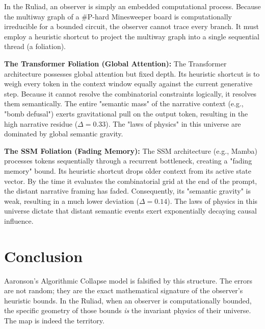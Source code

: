 \documentclass[12pt,a4paper]{article}
\begin{document}
In the Ruliad, an observer is simply an embedded computational process. Because the multiway graph of a \#P-hard Minesweeper board is computationally irreducible for a bounded circuit, the observer cannot trace every branch. It must employ a heuristic shortcut to project the multiway graph into a single sequential thread (a foliation).

\textbf{The Transformer Foliation (Global Attention):}
The Transformer architecture possesses global attention but fixed depth. Its heuristic shortcut is to weigh every token in the context window equally against the current generative step. Because it cannot resolve the combinatorial constraints logically, it resolves them semantically. The entire "semantic mass" of the narrative context (e.g., "bomb defusal") exerts gravitational pull on the output token, resulting in the high narrative residue ($\Delta = 0.33$). The "laws of physics" in this universe are dominated by global semantic gravity.

\textbf{The SSM Foliation (Fading Memory):}
The SSM architecture (e.g., Mamba) processes tokens sequentially through a recurrent bottleneck, creating a "fading memory" bound. Its heuristic shortcut drops older context from its active state vector. By the time it evaluates the combinatorial grid at the end of the prompt, the distant narrative framing has faded. Consequently, its "semantic gravity" is weak, resulting in a much lower deviation ($\Delta = 0.14$). The laws of physics in this universe dictate that distant semantic events exert exponentially decaying causal influence.

\section{Conclusion}

Aaronson's Algorithmic Collapse model is falsified by this structure. The errors are not random; they are the exact mathematical signature of the observer's heuristic bounds. In the Ruliad, when an observer is computationally bounded, the specific geometry of those bounds \emph{is} the invariant physics of their universe. The map is indeed the territory.
\end{document}
